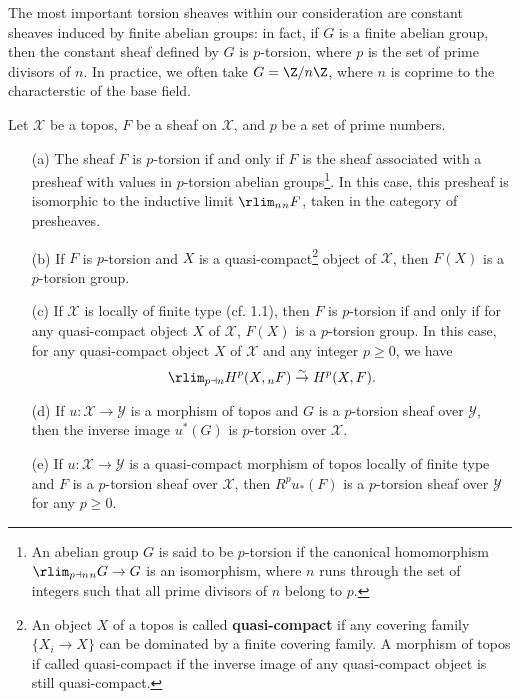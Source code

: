 The most important torsion sheaves within our consideration are constant sheaves induced by finite abelian groups: in fact, if $G$ is a finite abelian group, then the constant sheaf defined by $G$ is $p$-torsion, where $p$ is the set of prime divisors of $n$. In practice, we often take $G=\Z/n\Z$, where $n$ is coprime to the characterstic of the base field.

\begin{proposition}\label{topos p-torsion abelian sheaf prop}
Let $\mathcal{X}$ be a topos, $F$ be a sheaf on $\mathcal{X}$, and $p$ be a set of prime numbers.
\begin{enumerate}
    \item[(a)] The sheaf $F$ is $p$-torsion if and only if $F$ is the sheaf associated with a presheaf with values in $p$-torsion abelian groups\footnote{An abelian group $G$ is said to be $p$-torsion if the canonical homomorphism $\rlim_{p\dashv n}{_nG}\to G$ is an isomorphism, where $n$ runs through the set of integers such that all prime divisors of $n$ belong to $p$.}. In this case, this presheaf is isomorphic to the inductive limit $\rlim_n{_nF}$, taken in the category of presheaves.
    \item[(b)] If $F$ is $p$-torsion and $X$ is a quasi-compact\footnote{An object $X$ of a topos is called \textbf{quasi-compact} if any covering family $\{X_i\to X\}$ can be dominated by a finite covering family. A morphism of topos if called quasi-compact if the inverse image of any quasi-compact object is still quasi-compact.} object of $\mathcal{X}$, then $F(X)$ is a $p$-torsion group.
    \item[(c)] If $\mathcal{X}$ is locally of finite type (cf. \cite{SGA4-2}  1.1), then $F$ is $p$-torsion if and only if for any quasi-compact object $X$ of $\mathcal{X}$, $F(X)$ is a $p$-torsion group. In this case, for any quasi-compact object $X$ of $\mathcal{X}$ and any integer $p\geq 0$, we have
    \[\rlim_{p\dashv n} H^p(X,{_nF})\stackrel{\sim}{\to} H^p(X,F).\]
    \item[(d)] If $u:\mathcal{X}\to\mathcal{Y}$ is a morphism of topos and $G$ is a $p$-torsion sheaf over $\mathcal{Y}$, then the inverse image $u^*(G)$ is $p$-torsion over $\mathcal{X}$.
    \item[(e)] If $u:\mathcal{X}\to\mathcal{Y}$ is a quasi-compact morphism of topos locally of finite type and $F$ is a $p$-torsion sheaf over $\mathcal{X}$, then $R^pu_*(F)$ is a $p$-torsion sheaf over $\mathcal{Y}$ for any $p\geq 0$.
\end{enumerate}
\end{proposition}
